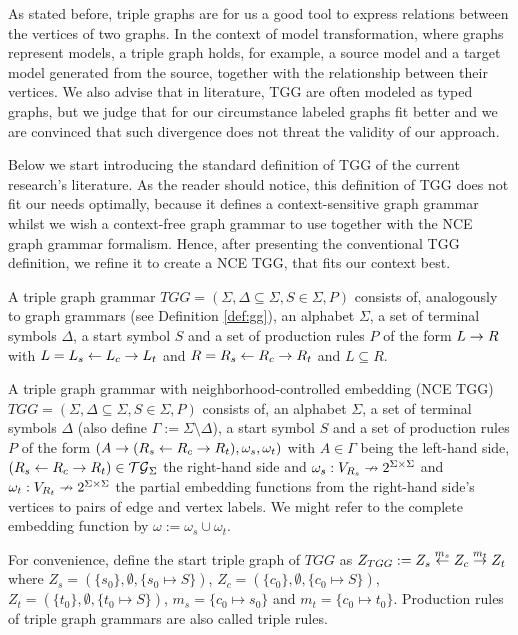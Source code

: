 \documentclass[]{report}
\begin{document}
As stated before, triple graphs are for us a good tool to express relations between the vertices of two graphs. In the context of model transformation, where graphs represent models, a triple graph holds, for example, a source model and a target model generated from the source, together with the relationship between their vertices. We also advise that in literature, TGG are often modeled as typed graphs, but we judge that for our circumstance labeled graphs fit better and we are convinced that such divergence does not threat the validity of our approach.

Below we start introducing the standard definition of TGG of the current research's literature. As the reader should notice, this definition of TGG does not fit our needs optimally, because it defines a context-sensitive graph grammar whilst we wish a context-free graph grammar to use together with the NCE graph grammar formalism. Hence, after presenting the conventional TGG definition, we refine it to create a NCE TGG, that fits our context best.

\begin{definition}
	\label{def:stgg}
	A triple graph grammar $TGG = (\Sigma, \Delta \subseteq \Sigma, S \in \Sigma, P)$ consists of, analogously to graph grammars (see Definition \ref{def:gg}), an alphabet $\Sigma$, a set of terminal symbols $\Delta$, a start symbol $S$ and a set of production rules $P$ of the form $L \to R$ with $L = L_s \overset{}{\leftarrow} L_c \overset{}{\rightarrow} L_t$ and $R = R_s \overset{}{\leftarrow} R_c \overset{}{\rightarrow} R_t$ and $L \subseteq R.$
\end{definition}

\begin{definition}
	\label{def:tgg}
	A triple graph grammar with neighborhood-controlled embedding (NCE TGG) $TGG = (\Sigma, \Delta \subseteq \Sigma, S \in \Sigma, P)$ consists of, an alphabet $\Sigma$, a set of terminal symbols $\Delta$ (also define $\Gamma := \Sigma \setminus \Delta$), a start symbol $S$ and a set of production rules $P$ of the form $(A \to (R_s \overset{}{\leftarrow} R_c \overset{}{\rightarrow} R_t), \omega_s, \omega_t)$ with $A \in \Gamma$ being the left-hand side, $(R_s \overset{}{\leftarrow} R_c \overset{}{\rightarrow} R_t) \in \mathcal{TG}_{\Sigma}$ the right-hand side and $\omega_s : V_{R_s} \nrightarrow 2^{\Sigma \times \Sigma}$ and $\omega_t : V_{R_t} \nrightarrow 2^{\Sigma \times \Sigma}$ the partial embedding functions from the right-hand side's vertices to pairs of edge and vertex labels. We might refer to the complete embedding function by $\omega:= \omega_s \cup \omega_t$.
	
	For convenience, define the start triple graph of $TGG$ as $Z_{TGG} := Z_s \overset{m_s}{\leftarrow} Z_c \overset{m_t}{\rightarrow} Z_t$ where $Z_s = (\{s_0\},\emptyset,\{s_0 \mapsto S\})$, $Z_c = (\{c_0\},\emptyset,\{c_0 \mapsto S\})$, $Z_t = (\{t_0\},\emptyset,\{t_0 \mapsto S\})$, $m_s = \{c_0 \mapsto s_0 \}$ and $m_t = \{c_0 \mapsto t_0 \}$. Production rules of triple graph grammars are also called triple rules.
	
\end{definition}
\end{document}
